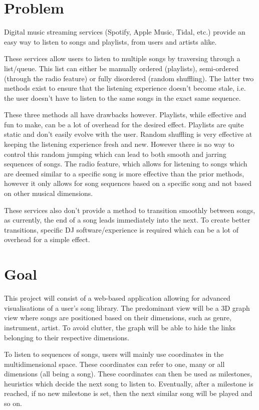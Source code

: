 \section{Problem}
Digital music streaming services (Spotify, Apple Music, Tidal, etc.) provide an easy way to listen to songs and playlists, from users and artists alike.

These services allow users to listen to multiple songs by traversing through a list/queue. This list can either be manually ordered (playlists), semi-ordered (through the radio feature) or fully disordered (random shuffling). The latter two methods exist to ensure that the listening experience doesn’t become stale, i.e. the user doesn’t have to listen to the same songs in the exact same sequence.

These three methods all have drawbacks however. Playlists, while effective and fun to make, can be a lot of overhead for the desired effect. Playlists are quite static and don’t easily evolve with the user. Random shuffling is very effective at keeping the listening experience fresh and new. However there is no way to control this random jumping which can lead to both smooth and jarring sequences of songs.  The radio feature, which allows for listening to songs which are deemed similar to a specific song is more effective than the prior methods, however it only allows for song sequences based on a specific song and not based on other musical dimensions.

These services also don’t provide a method to transition smoothly between songs, as currently, the end of a song leads immediately into the next. To create better transitions, specific DJ software/experience is required which can be a lot of overhead for a simple effect.

\section{Goal}

This project will consist of a web-based application allowing for advanced visualisations of a user’s song library. The predominant view will be a 3D graph view where songs are positioned based on their dimensions, such as genre, instrument, artist. To avoid clutter, the graph will be able to hide the links belonging to their respective dimensions.

To listen to sequences of songs, users will mainly use coordinates in the multidimensional space. These coordinates can refer to one, many or all dimensions (all being a song). These coordinates can then be used as milestones, heuristics which decide the next song to listen to. Eventually, after a milestone is reached, if no new milestone is set, then the next similar song will be played and so on.

